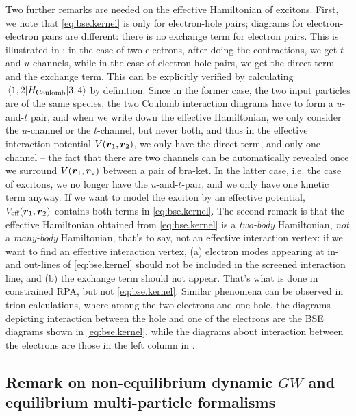 \documentclass[hyperref, a4paper, 12pt]{report}
\begin{document}
Two further remarks are needed on the effective Hamiltonian of excitons. 
First, we note that \eqref{eq:bse.kernel} is only for electron-hole pairs; 
diagrams for electron-electron pairs are different: 
there is no exchange term for electron pairs.
This is illustrated in :
in the case of two electrons, after doing the contractions,
we get $t$- and $u$-channels, 
while in the case of electron-hole pairs, 
we get the direct term and the exchange term.
This can be explicitly verified by calculating 
$\mel*{1, 2}{H_{\text{Coulomb}}}{3, 4}$ by definition.
Since in the former case, the two input particles are of the same species, 
the two Coulomb interaction diagrams have to form a $u$-and-$t$ pair, 
and when we write down the effective Hamiltonian, 
we only consider the $u$-channel or the $t$-channel, but never both, 
and thus in the effective interaction potential $V(\vb*{r}_1, \vb*{r}_2)$, 
we only have the direct term, 
and only one channel -- 
the fact that there are two channels can be automatically revealed 
once we surround $V(\vb*{r}_1, \vb*{r}_2)$ between a pair of bra-ket.
In the latter case, i.e. the case of excitons, 
we no longer have the $u$-and-$t$-pair, 
and we only have one kinetic term anyway.
If we want to model the exciton by an effective potential, 
$V_{\text{eff}}(\vb*{r}_1, \vb*{r}_2)$ contains both terms in \eqref{eq:bse.kernel}.
The second remark is that the effective Hamiltonian obtained from \eqref{eq:bse.kernel}
is a \emph{two-body} Hamiltonian, \emph{not} a \emph{many-body} Hamiltonian, 
that's to say, not an effective interaction vertex:
if we want to find an effective interaction vertex, 
(a) electron modes appearing at in- and out-lines of \eqref{eq:bse.kernel}
should not be included in the screened interaction line, and 
(b) the exchange term should not appear. 
That's what is done in constrained RPA, but not \eqref{eq:bse.kernel}.
Similar phenomena can be observed in trion calculations,
where among the two electrons and one hole, 
the diagrams depicting interaction between the hole and one of the electrons 
are the BSE diagrams shown in \eqref{eq:bse.kernel}, 
while the diagrams about interaction between the electrons 
are those in the left column in .

\subsection{Remark on non-equilibrium dynamic $GW$ and equilibrium multi-particle formalisms}
\end{document}
